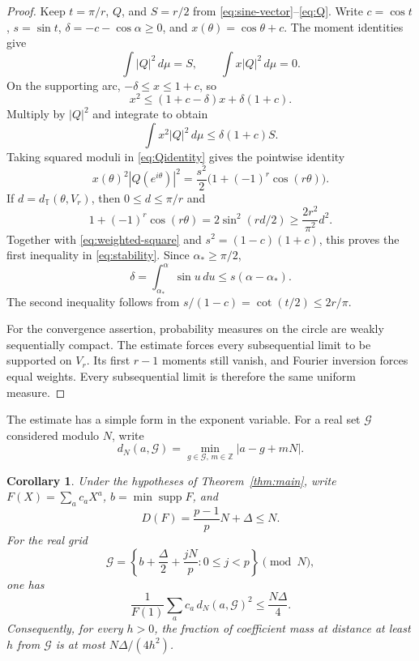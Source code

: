 \documentclass[11pt]{article}
\newtheorem{corollary}[theorem]{Corollary}
\theoremstyle{definition}
\theoremstyle{remark}
\numberwithin{equation}{section}
\DeclareMathOperator{\supp}{supp}
\newcommand{\T}{\mathbb T}
\newcommand{\Z}{\mathbb Z}
\begin{document}
\begin{proof}
Keep $t=\pi/r$, $Q$, and $S=r/2$ from
\eqref{eq:sine-vector}--\eqref{eq:Q}. Write
$c=\cos t$, $s=\sin t$, $\delta=-c-\cos\alpha\ge0$, and
$x(\theta)=\cos\theta+c$. The moment identities give
\begin{equation}\label{eq:stability-moments}
 \int |Q|^2\,d\mu=S,\qquad
 \int x|Q|^2\,d\mu=0.
\end{equation}
On the supporting arc, $-\delta\le x\le1+c$, so
\[
 x^2\le(1+c-\delta)x+\delta(1+c).
\]
Multiply by $|Q|^2$ and integrate to obtain
\begin{equation}\label{eq:weighted-square}
 \int x^2|Q|^2\,d\mu\le\delta(1+c)S.
\end{equation}
Taking squared moduli in \eqref{eq:Qidentity} gives the pointwise identity
\[
 x(\theta)^2|Q(e^{i\theta})|^2
 =\frac{s^2}{2}\bigl(1+(-1)^r\cos(r\theta)\bigr).
\]
If $d=d_{\T}(\theta,V_r)$, then $0\le d\le\pi/r$ and
\[
 1+(-1)^r\cos(r\theta)
 =2\sin^2(rd/2)\ge\frac{2r^2}{\pi^2}d^2.
\]
Together with \eqref{eq:weighted-square} and
$s^2=(1-c)(1+c)$, this proves the first inequality in
\eqref{eq:stability}. Since $\alpha_*\ge\pi/2$,
\[
 \delta=\int_{\alpha_*}^{\alpha}\sin u\,du
 \le s(\alpha-\alpha_*).
\]
The second inequality follows from
$s/(1-c)=\cot(t/2)\le2r/\pi$.

For the convergence assertion, probability measures on the circle are
weakly sequentially compact. The estimate forces every subsequential
limit to be supported on $V_r$. Its first $r-1$ moments still vanish,
and Fourier inversion forces equal weights. Every subsequential limit
is therefore the same uniform measure.
\end{proof}

The estimate has a simple form in the exponent variable. For a real
set $\mathcal G$ considered modulo $N$, write
\[
 d_N(a,\mathcal G)=\min_{g\in\mathcal G,\,m\in\Z}|a-g+mN|.
\]

\begin{corollary}\label{cor:exponent-stability}
Under the hypotheses of Theorem~\ref{thm:main}, write
$F(X)=\sum_ac_aX^a$, $b=\min\supp F$, and
\[
 D(F)=\frac{p-1}{p}N+\Delta\le N.
\]
For the real grid
\[
 \mathcal G=\left\{b+\frac\Delta2+\frac{jN}{p}:0\le j<p\right\}
 \pmod N,
\]
one has
\begin{equation}\label{eq:exponent-stability}
 \frac1{F(1)}\sum_ac_a\,d_N(a,\mathcal G)^2\le\frac{N\Delta}{4}.
\end{equation}
Consequently, for every $h>0$, the fraction of coefficient mass at
distance at least $h$ from $\mathcal G$ is at most $N\Delta/(4h^2)$.
\end{corollary}
\end{document}

